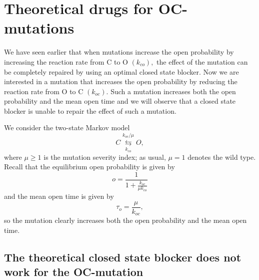 \section{Theoretical drugs for OC-mutations}

We have seen earlier that when mutations increase the open probability by
increasing the reaction rate from C to O $(k_{co}),$ the effect of the
mutation can be completely repaired by using an optimal closed state blocker.
Now we are interested in a mutation that increases the open probability by reducing
the reaction rate from O to C $\left(  k_{oc}\right).$ Such a mutation
increases both the open probability and  the mean open time
and we will observe that a closed state blocker is unable to repair the effect
of such a mutation.

We consider the two-state Markov model
\begin{equation}
C\underset{k_{co}}{\overset{k_{oc}/\mu}{\leftrightarrows}}O, \label{mmm0}
\end{equation}
where $\mu\geqslant1$ is the mutation severity index; as usual, $\mu=1$ denotes
the wild type. Recall that the equilibrium open probability is given by
\[
o=\frac{1}{1+\frac{k_{oc}}{\mu k_{co}}}
\]
and the mean open time is given by
\[
\tau_{o}=\frac{\mu}{k_{oc}},
\]
so the mutation clearly increases both the open probability and the mean open time.

\bigskip

\subsection{The theoretical closed state blocker does not work for the OC-mutation}

